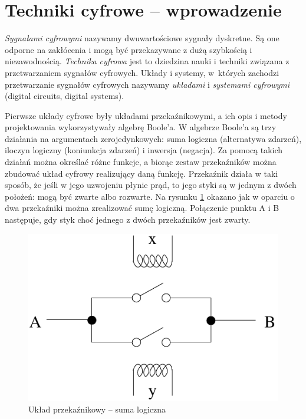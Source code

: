 \documentclass[a4paper,11pt]{article}
\begin{document}
 
\section*{Techniki cyfrowe -- wprowadzenie}
 \emph{Sygnałami cyfrowymi} nazywamy dwuwartościowe sygnały dyskretne. Są one odporne na zakłócenia i mogą być przekazywane z dużą szybkością i niezawodnością. \emph{Technika cyfrowa} jest to dziedzina nauki i techniki związana z przetwarzaniem sygnałów cyfrowych. Układy i systemy, w~których zachodzi przetwarzanie sygnałów cyfrowych nazywamy \emph{układami} i \emph{systemami cyfrowymi} (digital circuits, digital systems).
 
Pierwsze układy cyfrowe były układami przekaźnikowymi, a ich opis i metody projektowania
 wykorzystywały algebrę Boole'a. W algebrze Boole'a są trzy działania na argumentach zerojedynkowych: suma logiczna (alternatywa zdarzeń), iloczyn logiczny (koniunkcja zdarzeń) i inwersja (negacja). Za pomocą takich działań można określać różne funkcje, a biorąc zestaw przekaźników można zbudować układ cyfrowy realizujący daną funkcję. Przekaźnik działa w taki sposób, że jeśli w jego uzwojeniu płynie prąd, to jego styki są w jednym z dwóch położeń: mogą być zwarte albo rozwarte. Na rysunku \ref{fig:ukladPrzekaznikowy} okazano jak w oparciu o dwa przekaźniki  można zrealizować sumę logiczną. Połączenie punktu A i B następuje, gdy styk choć jednego z dwóch przekaźników jest zwarty.
 
\begin{figure}[!htb]
\centerline{\includegraphics[scale=0.6]{uklad-przekaznikowy.pdf}}
\caption{Układ przekaźnikowy -- suma logiczna}
\label{fig:ukladPrzekaznikowy}
\end{figure}
\end{document}
